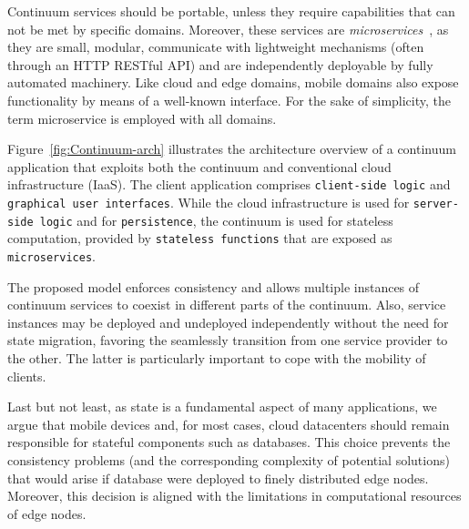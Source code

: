 Continuum services should be portable, unless they require capabilities that can not be met by specific domains. Moreover, these services are \textit{microservices}~\cite{lewis2014microservices}, as they are small, modular, communicate with lightweight mechanisms (often through an HTTP RESTful API) and are independently deployable by fully automated machinery. %
Like cloud and edge domains, mobile domains also expose functionality by means of a well-known interface. For the sake of simplicity, the term microservice is employed with all domains.

Figure~\ref{fig:Continuum-arch} illustrates the architecture overview of a continuum application that exploits both the continuum and conventional cloud infrastructure (IaaS). The client application comprises \texttt{client-side logic} and \texttt{graphical user interfaces}. While the cloud infrastructure is used for \texttt{server-side logic} and for \texttt{persistence}, the continuum is used for stateless computation, provided by \texttt{stateless functions} that are exposed as \texttt{microservices}.  

The proposed model enforces consistency and allows multiple instances of continuum services to coexist in different parts of the continuum. Also, service instances may be deployed and undeployed independently without the need for state migration, favoring the seamlessly transition from one service provider to the other. The latter is particularly important to cope with the mobility of clients.

Last but not least, as state is a fundamental aspect of many applications, we argue that mobile devices and, for most cases, cloud datacenters should remain responsible for stateful components such as databases. This choice prevents the consistency problems (and the corresponding complexity of potential solutions) that would arise if database were deployed to finely distributed edge nodes. Moreover, this decision is aligned with the limitations in computational resources of edge nodes. %


